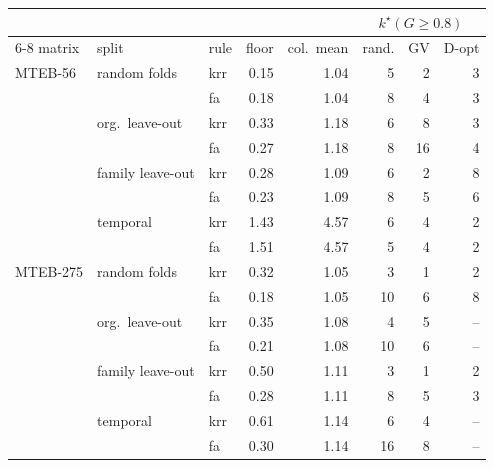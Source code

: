 \begin{tabular}{lllrrrrr}
\toprule
 & & & & & \multicolumn{3}{c}{$k^\star(G\geq0.8)$} \\
\cmidrule(lr){6-8}
matrix & split & rule & floor & col.\ mean & rand. & GV & D-opt \\
\midrule
MTEB-56 & random folds & krr & 0.15 & 1.04 & 5 & 2 & 3 \\
 &  & fa & 0.18 & 1.04 & 8 & 4 & 3 \\
 & org.\ leave-out & krr & 0.33 & 1.18 & 6 & 8 & 3 \\
 &  & fa & 0.27 & 1.18 & 8 & 16 & 4 \\
 & family leave-out & krr & 0.28 & 1.09 & 6 & 2 & 8 \\
 &  & fa & 0.23 & 1.09 & 8 & 5 & 6 \\
 & temporal & krr & 1.43 & 4.57 & 6 & 4 & 2 \\
 &  & fa & 1.51 & 4.57 & 5 & 4 & 2 \\
\midrule
MTEB-275 & random folds & krr & 0.32 & 1.05 & 3 & 1 & 2 \\
 &  & fa & 0.18 & 1.05 & 10 & 6 & 8 \\
 & org.\ leave-out & krr & 0.35 & 1.08 & 4 & 5 & -- \\
 &  & fa & 0.21 & 1.08 & 10 & 6 & -- \\
 & family leave-out & krr & 0.50 & 1.11 & 3 & 1 & 2 \\
 &  & fa & 0.28 & 1.11 & 8 & 5 & 3 \\
 & temporal & krr & 0.61 & 1.14 & 6 & 4 & -- \\
 &  & fa & 0.30 & 1.14 & 16 & 8 & -- \\
\bottomrule
\end{tabular}
